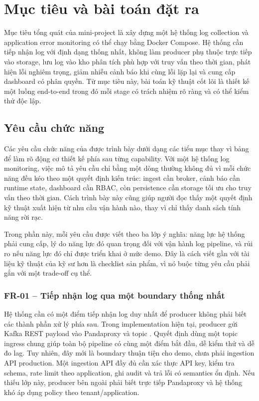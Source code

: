 \section{Mục tiêu và bài toán đặt ra}

Mục tiêu tổng quát của mini-project là xây dựng một hệ thống log collection và application error monitoring có thể chạy bằng Docker Compose. Hệ thống cần tiếp nhận log với định dạng thống nhất, không làm producer phụ thuộc trực tiếp vào storage, lưu log vào kho phân tích phù hợp với truy vấn theo thời gian, phát hiện lỗi nghiêm trọng, giảm nhiễu cảnh báo khi cùng lỗi lặp lại và cung cấp dashboard có phân quyền. Từ mục tiêu này, bài toán kỹ thuật cốt lõi là thiết kế một luồng end-to-end trong đó mỗi stage có trách nhiệm rõ ràng và có thể kiểm thử độc lập.

\subsection{Yêu cầu chức năng}

Các yêu cầu chức năng của \LogRider{} được trình bày dưới dạng các tiểu mục thay vì bảng để làm rõ động cơ thiết kế phía sau từng capability. Với một hệ thống log monitoring, việc mô tả yêu cầu chỉ bằng một dòng thường không đủ vì mỗi chức năng đều kéo theo một quyết định kiến trúc: ingest cần broker, cảnh báo cần runtime state, dashboard cần RBAC, còn persistence cần storage tối ưu cho truy vấn theo thời gian. Cách trình bày này cũng giúp người đọc thấy một quyết định kỹ thuật xuất hiện từ nhu cầu vận hành nào, thay vì chỉ thấy danh sách tính năng rời rạc.

Trong phần này, mỗi yêu cầu được viết theo ba lớp ý nghĩa: năng lực hệ thống phải cung cấp, lý do năng lực đó quan trọng đối với vận hành log pipeline, và rủi ro nếu năng lực đó chỉ được triển khai ở mức demo. Đây là cách viết gần với tài liệu kỹ thuật của kỹ sư hơn là checklist sản phẩm, vì nó buộc từng yêu cầu phải gắn với một trade-off cụ thể.

\subsubsection{FR-01 -- Tiếp nhận log qua một boundary thống nhất}

Hệ thống cần có một điểm tiếp nhận log duy nhất để producer không phải biết các thành phần xử lý phía sau. Trong implementation hiện tại, producer gửi Kafka REST payload vào Pandaproxy và topic . Quyết định dùng một topic ingress chung giúp toàn bộ pipeline có cùng một điểm bắt đầu, dễ kiểm thử và dễ đo lag. Tuy nhiên, đây mới là boundary thuận tiện cho demo, chưa phải ingestion API production. Một ingestion API đầy đủ cần xác thực API key, kiểm tra schema, rate limit theo application, ghi audit và trả lỗi có semantics ổn định. Nếu thiếu lớp này, producer bên ngoài phải biết trực tiếp Pandaproxy và hệ thống khó áp dụng policy theo tenant/application.

